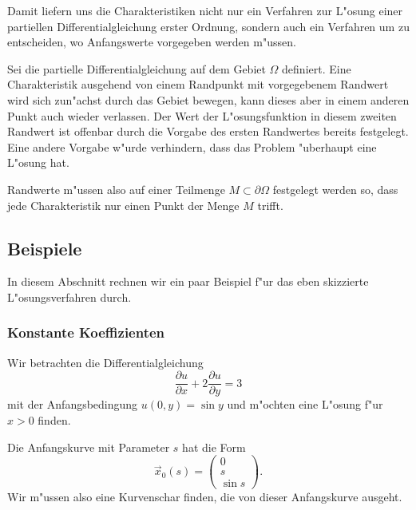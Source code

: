 Damit liefern uns die Charakteristiken nicht nur ein Verfahren
zur L"osung einer partiellen Differentialgleichung erster Ordnung,
sondern auch ein Verfahren um zu entscheiden, wo Anfangswerte
vorgegeben werden m"ussen.

Sei die partielle Differentialgleichung auf dem Gebiet $\Omega$
definiert.
Eine Charakteristik ausgehend von einem Randpunkt mit vorgegebenem
Randwert wird sich zun"achst durch das Gebiet bewegen, kann dieses
aber in einem anderen Punkt auch wieder verlassen. Der Wert der
L"osungsfunktion in diesem zweiten Randwert ist offenbar durch die
Vorgabe des ersten Randwertes bereits festgelegt.
Eine andere Vorgabe w"urde verhindern, dass das Problem "uberhaupt
eine L"osung hat.

Randwerte m"ussen also auf einer Teilmenge $M\subset\partial \Omega$
festgelegt werden so, dass jede Charakteristik nur einen Punkt der
Menge $M$ trifft.

\subsection{Beispiele}
In diesem Abschnitt rechnen wir ein paar Beispiel f"ur das eben
skizzierte L"osungsverfahren durch.
\subsubsection{Konstante Koeffizienten\label{konstantekoeff}}
Wir betrachten die Differentialgleichung
\[
\frac{\partial u}{\partial x}+2\frac{\partial u}{\partial y}=3
\]
mit der Anfangsbedingung $u(0,y)=\sin y$ und m"ochten eine L"osung f"ur
$x>0$ finden.

Die Anfangskurve mit Parameter $s$ hat die Form
\[
\vec x_0(s)
=
\begin{pmatrix}
0\\s\\\sin s
\end{pmatrix}.
\]
Wir m"ussen also eine Kurvenschar finden, die von dieser Anfangskurve
ausgeht.

